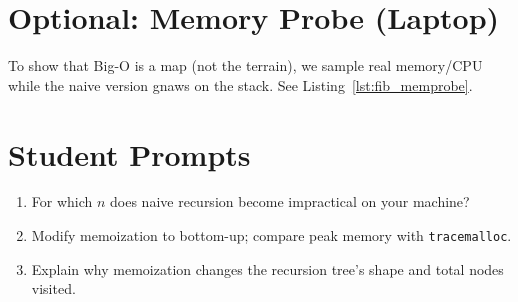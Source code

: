 \section{Optional: Memory Probe (Laptop)}
To show that Big-O is a map (not the terrain), we sample real memory/CPU while the naive version gnaws on the stack. See Listing~\ref{lst:fib_memprobe}.


\section{Student Prompts}
\begin{enumerate}
  \item For which $n$ does naive recursion become impractical on your machine?
  \item Modify memoization to bottom-up; compare peak memory with \texttt{tracemalloc}.
  \item Explain why memoization changes the recursion tree’s shape and total nodes visited.
\end{enumerate}

